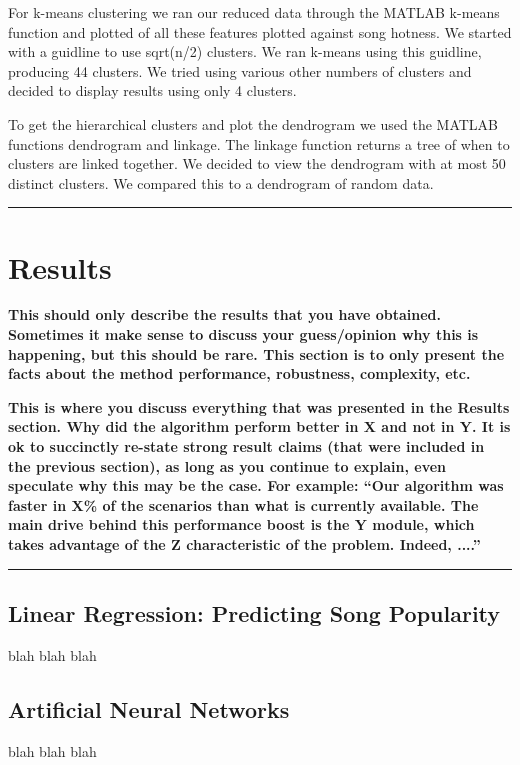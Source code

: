 \documentclass[12pt]{article}
\newcommand{\horizontalLine}{
	\begin{center}
		\hrule width 1.0\textwidth
	\end{center}
}
\newcommand{\smallHorizontalLine}{
    \begin{center}
        \hrule width 0.5\textwidth
    \end{center}}
\begin{document}
For k-means clustering we ran our reduced data through the MATLAB k-means function and plotted of all these features plotted against song hotness. We started with a guidline to use sqrt(n/2) clusters. We ran k-means using this guidline, producing 44 clusters. We tried using various other numbers of clusters and decided to display results using only 4 clusters.

To get the hierarchical clusters and plot the dendrogram we used the MATLAB functions dendrogram and linkage. The linkage function returns a tree of when to clusters are linked together. We decided to view the dendrogram with at most 50 distinct clusters. We compared this to a dendrogram of random data.

\horizontalLine
\section{Results}
\label{sec:results}

\textbf{This should only describe the results that you have obtained. Sometimes it make sense
to discuss your guess/opinion why this is happening, but this should be rare. This section is to
only present the facts about the method performance, robustness, complexity, etc.}

\textbf{This is where you discuss everything that was presented in the Results section.
Why did the algorithm perform better in X and not in Y. It is ok to succinctly re-state strong
result claims (that were included in the previous section), as long as you continue to explain,
even speculate why this may be the case. For example: \textquotedblleft Our algorithm was faster in X\% of the
scenarios than what is currently available. The main drive behind this performance boost is the Y module, which takes advantage of the Z characteristic of the problem. Indeed, ....\textquotedblright}
\smallHorizontalLine

\subsection{Linear Regression: Predicting Song Popularity}
\label{subsec:linearRegressionResults}
blah blah blah

\subsection{Artificial Neural Networks}
\label{subsec:annResults}
blah blah blah
\end{document}
